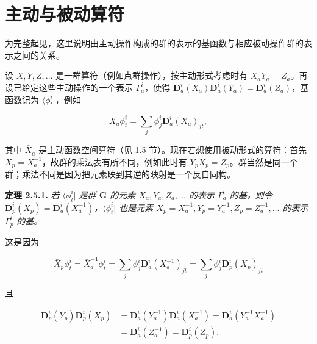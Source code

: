 \section{主动与被动算符}

为完整起见，这里说明由主动操作构成的群的表示的基函数与相应被动操作群的表示之间的关系。

设 $X, Y, Z, \ldots$ 是一群算符（例如点群操作），按主动形式考虑时有 $X_{a}Y_{a} = Z_{a}$。再设已给定这些主动操作的一个表示 $\Gamma_{a}^{i}$，使得 $\mathbf{D}_{a}^{i}(X_{a})\mathbf{D}_{a}^{i}(Y_{a}) = \mathbf{D}_{a}^{i}(Z_{a})$，基函数记为 $\langle \phi_{t}^{i}|$，例如

\begin{equation*}
\bar{X}_{a}\phi_{t}^{i} = \sum_{j} \phi_{j}^{i}\mathbf{D}_{a}^{i}(X_{a})_{jt},
\tag{2.5.1}
\end{equation*}

其中 $\bar{X}_{a}$ 是主动函数空间算符（见 1.5 节）。现在若想使用被动形式的算符：首先 $X_{p} = X_{a}^{-1}$，故群的乘法表有所不同，例如此时有 $Y_{p}X_{p} = Z_{p}$。群当然是同一个群；乘法不同是因为把元素映到其逆的映射是一个反自同构。

\textbf{定理 2.5.1.} \textit{若 $\langle \phi_{t}^{i}|$ 是群 $\mathbf{G}$ 的元素 $X_{a}, Y_{a}, Z_{a}, \ldots$ 的表示 $\Gamma_{a}^{i}$ 的基，则令 $\mathbf{D}_{p}^{i}(X_{p}) = \mathbf{D}_{a}^{i}(X_{a}^{-1})$，$\langle \phi_{t}^{i}|$ 也是元素 $X_{p} = X_{a}^{-1}, Y_{p} = Y_{a}^{-1}, Z_{p} = Z_{a}^{-1}, \ldots$ 的表示 $\Gamma_{p}^{i}$ 的基。}

这是因为

\begin{equation*}
\bar{X}_{p}\phi_{t}^{i} = \bar{X}_{a}^{-1}\phi_{t}^{i} = \sum_{j} \phi_{j}^{i}\mathbf{D}_{a}^{i}(X_{a}^{-1})_{jt} = \sum_{j} \phi_{j}^{i}\mathbf{D}_{p}^{i}(X_{p})_{jt}
\tag{2.5.2}
\end{equation*}

且

\begin{equation*}
\begin{aligned}
\mathbf{D}_{p}^{i}(Y_{p})\mathbf{D}_{p}^{i}(X_{p}) &= \mathbf{D}_{a}^{i}(Y_{a}^{-1})\mathbf{D}_{a}^{i}(X_{a}^{-1}) = \mathbf{D}_{a}^{i}(Y_{a}^{-1}X_{a}^{-1}) \\
&= \mathbf{D}_{a}^{i}(Z_{a}^{-1}) = \mathbf{D}_{p}^{i}(Z_{p}).
\end{aligned}
\tag{2.5.3}
\end{equation*}

